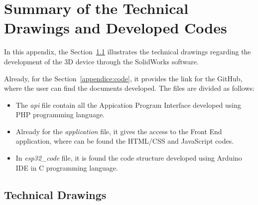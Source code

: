 \chapter{Summary of the Technical Drawings and Developed Codes}
\label{apendice2}

In this appendix, the Section~\ref{appendice:technicalDrawings} illustrates the technical drawings regarding the development of the 3D device through the SolidWorks software.

Already, for the Section~\ref{appendice:code}, it provides the link for the GitHub, where the user can find the documents developed. The files are divided as follows:

\begin{itemize}
    \item The \textit{api} file contain all the Appication Program Interface developed using PHP programming language.
    \item Already for the \textit{application} file, it gives the access to the Front End application, where can be found the HTML/CSS and JavaScript codes.
    \item In \textit{esp32\_code} file, it is found the code structure developed using Arduino IDE in C programming language.
\end{itemize}




\clearpage
\section{Technical Drawings}\label{appendice:technicalDrawings}

